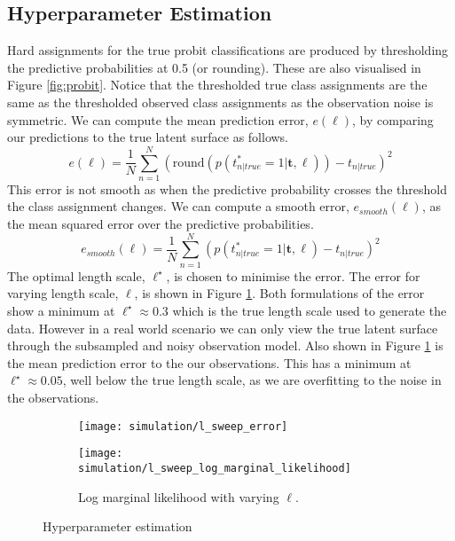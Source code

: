 \documentclass[11pt]{article}
\begin{document}
\subsection{Hyperparameter Estimation}
\label{sec:hyperparameter_estimation}
Hard assignments for the true probit classifications are produced by thresholding the predictive probabilities at 0.5 (or rounding). These are also visualised in Figure \ref{fig:probit}. Notice that the thresholded true class assignments are the same as the thresholded observed class assignments as the observation noise is symmetric. We can compute the mean prediction error, $e(\ell)$, by comparing our predictions to the true latent surface as follows.
\begin{equation}
    e(\ell) = \frac{1}{N}\sum_{n=1}^N (\text{round}(p(t_{n|true}^*=1|\boldsymbol{t}, \ell)) - t_{n|true})^2
\end{equation}
This error is not smooth as when the predictive probability crosses the threshold the class assignment changes. We can compute a smooth error, $e_{smooth}(\ell)$, as the mean squared error over the predictive probabilities.
\begin{equation}
    e_{smooth}(\ell) = \frac{1}{N}\sum_{n=1}^N (p(t_{n|true}^*=1|\boldsymbol{t}, \ell) - t_{n|true})^2
\end{equation}
The optimal length scale, $\ell^{\star}$, is chosen to minimise the error. The error for varying length scale, $\ell$, is shown in Figure \ref{fig:prediction_error}. Both formulations of the error show a minimum at $\ell^{\star} \approx 0.3$ which is the true length scale used to generate the data. However in a real world scenario we can only view the true latent surface through the subsampled and noisy observation model. Also shown in Figure \ref{fig:prediction_error} is the mean prediction error to the our observations. This has a minimum at $\ell^{\star} \approx 0.05$, well below the true length scale, as we are overfitting to the noise in the observations.
\begin{figure}
    \centering
    \begin{subfigure}{0.45\textwidth}        
        \texttt{[image: simulation/l\_sweep\_error]}
        \label{fig:prediction_error}
    \end{subfigure}
    \begin{subfigure}{0.45\textwidth}        
        \texttt{[image: simulation/l\_sweep\_log\_marginal\_likelihood]}
        \caption{Log marginal likelihood with varying $\ell$.}
        \label{fig:marginal_likelihood}
    \end{subfigure}
    \caption{Hyperparameter estimation}
\end{figure}
\end{document}
